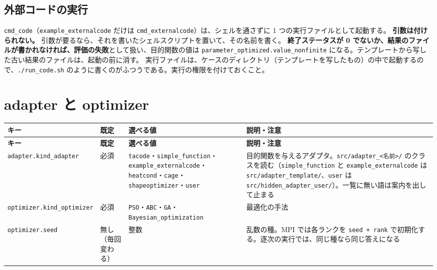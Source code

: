 \subsection{外部コードの実行}

\texttt{cmd\_\allowbreak{}code}（\texttt{example\_\allowbreak{}externalcode} だけは \texttt{cmd\_\allowbreak{}externalcode}）は、シェルを通さずに 1 つの実行ファイルとして起動する。
\textbf{引数は付けられない。} 引数が要るなら、それを書いたシェルスクリプトを置いて、その名前を書く。
\textbf{終了ステータスが 0 でないか、結果のファイルが書かれなければ、評価の失敗}として扱い、目的関数の値は \texttt{parameter\_\allowbreak{}optimized.\allowbreak{}value\_\allowbreak{}nonfinite} になる。テンプレートから写した古い結果のファイルは、起動の前に消す。
実行ファイルは、ケースのディレクトリ（テンプレートを写したもの）の中で起動するので、\texttt{.\allowbreak{}/\allowbreak{}run\_\allowbreak{}code.\allowbreak{}sh} のように書くのがふつうである。実行の権限を付けておくこと。

\section{adapter と optimizer}

\begingroup\small
\begin{longtable}{>{\raggedright\arraybackslash}p{}>{\raggedright\arraybackslash}p{}>{\raggedright\arraybackslash}p{}>{\raggedright\arraybackslash}p{}}
\toprule
\textbf{キー} & \textbf{既定} & \textbf{選べる値} & \textbf{説明・注意} \\
\midrule
\endfirsthead
\toprule
\textbf{キー} & \textbf{既定} & \textbf{選べる値} & \textbf{説明・注意} \\
\midrule
\endhead
\bottomrule
\endlastfoot
\texttt{adapter.\allowbreak{}kind\_\allowbreak{}adapter} & 必須 & \texttt{tacode}・\texttt{simple\_\allowbreak{}function}・\texttt{example\_\allowbreak{}externalcode}・\texttt{heatcond}・\texttt{cage}・\texttt{shapeoptimizer}・\texttt{user} & 目的関数を与えるアダプタ。\texttt{src/\allowbreak{}adapter\_\allowbreak{}<名前>/\allowbreak{}} のクラスを読む（\texttt{simple\_\allowbreak{}function} と \texttt{example\_\allowbreak{}externalcode} は \texttt{src/\allowbreak{}adapter\_\allowbreak{}template/\allowbreak{}}、\texttt{user} は \texttt{src/\allowbreak{}hidden\_\allowbreak{}adapter\_\allowbreak{}user/\allowbreak{}}）。一覧に無い語は案内を出して止まる \\
\texttt{optimizer.\allowbreak{}kind\_\allowbreak{}optimizer} & 必須 & \texttt{PSO}・\texttt{ABC}・\texttt{GA}・\texttt{Bayesian\_\allowbreak{}optimization} & 最適化の手法 \\
\texttt{optimizer.\allowbreak{}seed} & 無し（毎回変わる） & 整数 & 乱数の種。MPI では各ランクを \texttt{seed + rank} で初期化する。逐次の実行では、同じ種なら同じ答えになる \\
\end{longtable}
\endgroup


